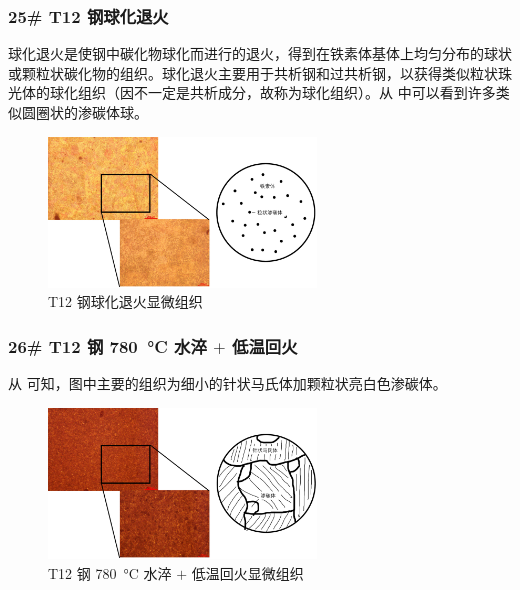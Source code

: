\documentclass[a4paper,utf8]{article}
\begin{document}
        \subsubsection{25# T12 钢球化退火}
            球化退火是使钢中碳化物球化而进行的退火，得到在铁素体基体上均匀分布的球状或颗粒状碳化物的组织。球化退火主要用于共析钢和过共析钢，以获得类似粒状珠光体的球化组织（因不一定是共析成分，故称为球化组织）。从 中可以看到许多类似圆圈状的渗碳体球。
            \begin{figure}[!ht]
                \includegraphics[height=40mm]{result/12.pdf}
                \caption{T12 钢球化退火显微组织\label{fig:12}}
            \end{figure}

        \subsubsection{26# T12 钢 \SI{780}{\degreeCelsius} 水淬 $+$ 低温回火\label{ss2:t12_780}}
            从 可知，图中主要的组织为细小的针状马氏体加颗粒状亮白色渗碳体。
            \begin{figure}[!ht]
                \includegraphics[height=40mm]{result/13.pdf}
                \caption{T12 钢 \SI{780}{\degreeCelsius} 水淬 $+$ 低温回火显微组织\label{fig:13}}
            \end{figure}
\end{document}
